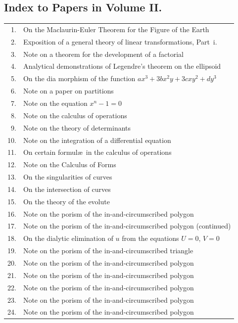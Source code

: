 \documentclass[11pt,a4paper]{book}
\begin{document}
\begin{center}
\section*{Index to Papers in Volume II.}

\begin{longtable}{rp{}}
1. & On the Maclaurin-Euler Theorem for the Figure of the Earth \\
2. & Exposition of a general theory of linear transformations, Part~i. \\
3. & Note on a theorem for the development of a factorial \\
4. & Analytical demonstrations of Legendre's theorem on the ellipsoid \\
5. & On the dia morphism of the function $ax^3+3bx^2y+3cxy^2+dy^3$ \\
6. & Note on a paper on partitions \\
7. & Note on the equation $x^n-1=0$ \\
8. & Note on the calculus of operations \\
9. & Note on the theory of determinants \\
10. & Note on the integration of a differential equation \\
11. & On certain formul\ae\ in the calculus of operations \\
12. & Note on the Calculus of Forms \\
13. & On the singularities of curves \\
14. & On the intersection of curves \\
15. & On the theory of the evolute \\
16. & Note on the porism of the in-and-circumscribed polygon \\
17. & Note on the porism of the in-and-circumscribed polygon (continued) \\
18. & On the dialytic elimination of $u$ from the equations $U=0$, $V=0$ \\
19. & Note on the porism of the in-and-circumscribed triangle \\
20. & Note on the porism of the in-and-circumscribed polygon \\
21. & Note on the porism of the in-and-circumscribed polygon \\
22. & Note on the porism of the in-and-circumscribed polygon \\
23. & Note on the porism of the in-and-circumscribed polygon \\
24. & Note on the porism of the in-and-circumscribed polygon \\

\end{longtable}
\end{center}
\end{document}
